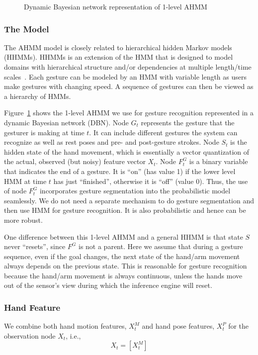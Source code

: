 \documentclass{sig-alternate}
\begin{document}
\begin{figure}
\centering
{}
\caption{Dynamic Bayesian network representation of 1-level AHMM}
\label{fig:ahmm}
\end{figure}


\subsubsection{The Model}
The AHMM model is closely related to hierarchical hidden Markov models (HHMMs).
HHMMs is an extension of the HMM that is designed to model domains with
hierarchical structure and/or dependencies at multiple length/time
scales~\cite{murphy02}. Each gesture can be modeled by an HMM with variable
length as users make gestures with changing speed. A sequence of gestures can
then be viewed as a hierarchy of HMMs. 

Figure~\ref{fig:ahmm} shows the 1-level AHMM we use for gesture recognition 
represented in a dynamic Bayesian network (DBN). Node
$G_t$ represents the gesture that the
gesturer is making at time $t$. It can include different gestures the system
can recognize as well as rest poses and pre- and post-gesture strokes.
Node $S_t$ is the hidden state of the hand movement, which is essentially a
vector quantization of the actual, observed (but noisy) feature vector $X_t$. 
Node $F_t^G$ is a binary variable that indicates the end of a
gesture. It is ``on'' (has value 1) if the lower level HMM at time $t$ has just
``finished'', otherwise it is ``off'' (value 0). Thus, the use of node $F_t^G$
incorporates gesture segmentation into the probabilistic model seamlessly. We
do not need a separate mechanism to do gesture segmentation and then use HMM for
gesture recognition. It is also probabilistic and hence can be more robust.

One difference between this 1-level AHMM and a general HHMM is that state $S$ never
``resets'', since $F^G$ is not a parent. Here we assume that during a gesture sequence, even if the goal changes,
the next state of the hand/arm movement always depends on the previous state. This is reasonable for gesture recognition because the hand/arm 
movement is always continuous, unless the hands move out of the sensor's view during
which the inference engine will reset. 

\subsubsection{Hand Feature}
We combine both hand motion features, $X^M_t$ and hand pose features, $X^P_t$
for the observation node $X_t$, i.e., 
\begin{displaymath}
X_t = \left[X^M_t\right]
\end{displaymath} 
\end{document}
